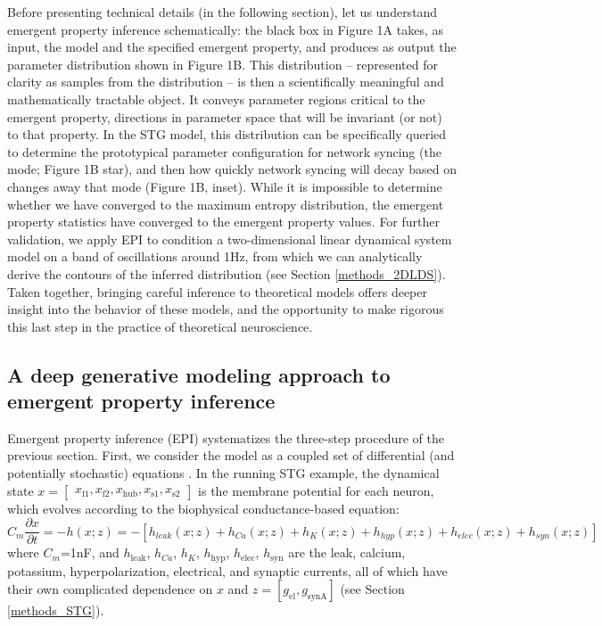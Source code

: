 \documentclass[11pt]{article}
\begin{document}
Before presenting technical details (in the following section), let us understand emergent property inference schematically:  the black box in Figure 1A takes, as input, the model and the specified emergent property, and produces as output the parameter distribution shown in Figure 1B.  
This distribution -- represented for clarity as samples from the distribution -- is then a scientifically meaningful and mathematically tractable object.  
It conveys parameter regions critical to the emergent property, directions in parameter space that will be invariant (or not) to that property.  
In the STG model, this distribution can be specifically queried to determine the prototypical parameter configuration for network syncing (the mode; Figure 1B star), and then how quickly network syncing will decay based on changes away that mode (Figure 1B, inset).  
While it is impossible to determine whether we have converged to the maximum entropy distribution, the emergent property statistics have converged to the emergent property values.  
For further validation, we apply EPI to condition a two-dimensional linear dynamical system model on a band of oscillations around 1Hz, from which we can analytically derive the contours of the inferred distribution (see Section \ref{methods_2DLDS}).
Taken together, bringing careful inference to theoretical models offers deeper insight into the behavior of these models, and the opportunity to make rigorous this last step in the practice of theoretical neuroscience.

\subsection{A deep generative modeling approach to emergent property inference} \label{results_dgm}

Emergent property inference (EPI) systematizes the three-step procedure of the previous section.
First, we consider the model as a coupled set of differential (and potentially stochastic) equations \cite{gutierrez2013multiple}.  In the running STG example, the dynamical state $x = \begin{bmatrix} x_{\text{f1}}, x_{\text{f2}}, x_{\text{hub}}, x_{\text{s1}}, x_{\text{s2}} \end{bmatrix}$ is the membrane potential for each neuron, which evolves according to the biophysical conductance-based equation:
\begin{equation} C_m \frac{\partial x}{\partial t} = -h(x; z) = - \left[ h_{leak}(x; z) + h_{Ca}(x; z) + h_K(x; z) + h_{hyp}(x; z) + h_{elec}(x; z) + h_{syn}(x; z)\right] 
\end{equation} 
where $C_m$=1nF, and $h_{\text{leak}}$, $h_{Ca}$, $h_K$, $h_{\text{hyp}}$, $h_{\text{elec}}$, $h_{\text{syn}}$ are the leak, calcium, potassium, hyperpolarization, electrical, and synaptic currents, all of which have their own complicated dependence on $x$ and $z = [g_{\text{el}}, g_{\text{synA}}]$ (see Section \ref{methods_STG}).
\end{document}
